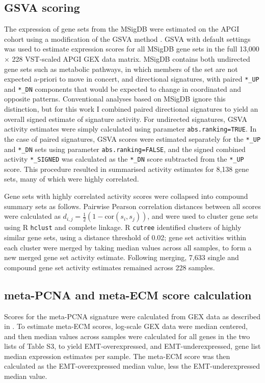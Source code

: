 \documentclass[dissertation.tex]{subfiles}
\begin{document}
\subsection{\acrshort{GSVA} scoring}
The expression of gene sets from the \gls{MSigDB} \cite{Subramanian2005} were estimated on the \gls{APGI} cohort using a modification of the \gls{GSVA} method \cite{Hanzelmann2013}.  \gls{GSVA} with default settings was used to estimate expression scores for all \gls{MSigDB} gene sets in the full 13,000 $\times$ 228 \gls{VST}-scaled \gls{APGI} \gls{GEX} data matrix.  \gls{MSigDB} contains both undirected gene sets such as metabolic pathways, in which members of the set are not expected a-priori to move in concert, and directional signatures, with paired \texttt{*\_UP} and \texttt{*\_DN} components that would be expected to change in coordinated and opposite patterns.  Conventional analyses based on \gls{MSigDB} ignore this distinction, but for this work I combined paired directional signatures to yield an overall signed estimate of signature activity.  For undirected signatures, \gls{GSVA} activity estimates were simply calculated using parameter \texttt{abs.ranking=TRUE}.  In the case of paired signatures, \gls{GSVA} scores were estimated separately for the \texttt{*\_UP} and \texttt{*\_DN} sets using parameter \texttt{abs.ranking=FALSE}, and the signed combined activity \texttt{*\_SIGNED} was calculated as the \texttt{*\_DN} score subtracted from the \texttt{*\_UP} score.  This procedure resulted in summarised activity estimates for 8,138 gene sets, many of which were highly correlated.

Gene sets with highly correlated activity scores were collapsed into compound summary sets as follows.  Pairwise Pearson correlation distances between all scores were calculated as $d_{i,j} = \frac{1}{2}(1 - \text{cor}(s_i, s_j))$, and were used to cluster gene sets using R \texttt{hclust} and complete linkage.  R \texttt{cutree} identified clusters of highly similar gene sets, using a distance threshold of 0.02; gene set activities within each cluster were merged by taking median values across all samples, to form a new merged gene set activity estimate.  Following merging, 7,633 single and compound gene set activity estimates remained across 228 samples.

\subsection{meta-PCNA and meta-ECM score calculation}
Scores for the meta-PCNA signature were calculated from \gls{GEX} data as described in \cite{Venet2011}.  To estimate meta-ECM scores, log-scale \gls{GEX} data were median centered, and then median values across samples were calculated for all genes in the two lists of \cite{Groger2012} Table S3, to yield EMT-overexpressed, and EMT-underexpressed, gene list median expression estimates per sample.  The meta-ECM score was then calculated as the EMT-overexpressed median value, less the EMT-underexpressed median value.
\end{document}
